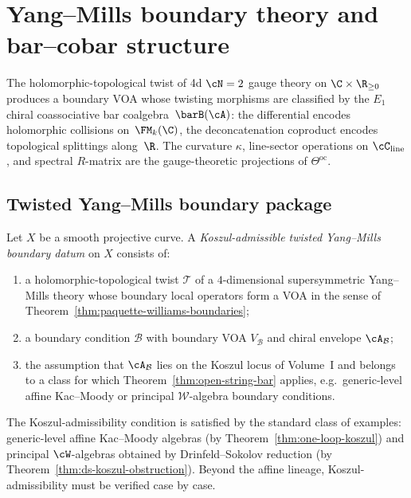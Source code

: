 \providecommand{\cH}{\mathcal{H}}
\providecommand{\cB}{\mathcal{B}}
\providecommand{\Barch}{\overline{B}^{\mathrm{ch}}}

\section{Yang--Mills boundary theory and bar--cobar structure}
\label{sec:ym-boundary-bar-cobar-core}

The holomorphic-topological twist of 4d $\cN = 2$ gauge theory on $\C \times \R_{\ge 0}$ produces a boundary VOA whose twisting morphisms are classified by the $E_1$ chiral coassociative bar coalgebra~$\barB(\cA)$: the differential encodes holomorphic collisions on~$\FM_k(\C)$, the deconcatenation coproduct encodes topological splittings along~$\R$. The curvature $\kappa$, line-sector operations on $\cC_{\mathrm{line}}$, and spectral $R$-matrix are the gauge-theoretic projections of $\Theta^{\mathrm{oc}}$.

\subsection{Twisted Yang--Mills boundary package}
\label{subsec:twisted-ym-boundary-package}

\begin{definition}
\label{def:twisted-ym-boundary-datum}
Let $X$ be a smooth projective curve. A \emph{Koszul-admissible twisted Yang--Mills boundary datum}
on $X$ consists of:
\begin{enumerate}[label=(\roman*)]
\item a holomorphic-topological twist $\mathcal{T}$ of a $4$-dimensional supersymmetric
Yang--Mills theory whose boundary local operators form a VOA in the sense of
Theorem~\ref{thm:paquette-williams-boundaries};
\item a boundary condition $\cB$ with boundary VOA $V_{\cB}$ and chiral envelope $\cA_{\cB}$;
\item the assumption that $\cA_{\cB}$ lies on the Koszul locus of Volume~I and belongs to a class
for which Theorem~\ref{thm:open-string-bar} applies, e.g.\ generic-level affine
Kac--Moody or principal $\mathcal{W}$-algebra boundary conditions.
\end{enumerate}
\end{definition}

\begin{remark}
\label{rem:koszul-admissible-examples}
The Koszul-admissibility condition is satisfied by the standard class of examples: generic-level affine Kac--Moody algebras (by Theorem~\ref{thm:one-loop-koszul}) and principal $\cW$-algebras obtained by Drinfeld--Sokolov reduction (by Theorem~\ref{thm:ds-koszul-obstruction}). Beyond the affine lineage, Koszul-admissibility must be verified case by case.
\end{remark}

